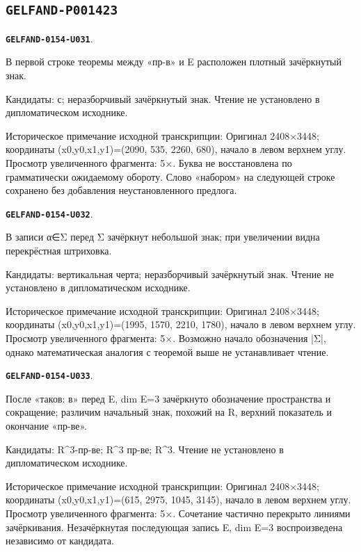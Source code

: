\documentclass[11pt]{article}
\theoremstyle{definition}
\theoremstyle{remark}
\begin{document}
\subsection*{\texttt{GELFAND-P001423}}
\par\noindent\leavevmode{}\label{GELFAND-0154-U031}\label{GELFAND-P001423:theorem-cancelled-sign:note}\textbf{\texttt{GELFAND-0154-U031}}.\nopagebreak[4]\par
В первой строке теоремы между «пр-в» и E расположен плотный зачёркнутый знак.\par
Кандидаты: с; неразборчивый зачёркнутый знак. Чтение не установлено в дипломатическом исходнике.\par
Историческое примечание исходной транскрипции: Оригинал 2408×3448; координаты (x0,y0,x1,y1)=(2090, 535, 2260, 680), начало в левом верхнем углу. Просмотр увеличенного фрагмента: 5×. Буква не восстановлена по грамматически ожидаемому обороту. Слово «набором» на следующей строке сохранено без добавления неустановленного предлога.\par\medskip
\par\noindent\leavevmode{}\label{GELFAND-0154-U032}\label{GELFAND-P001423:representation-cancelled-sign:note}\textbf{\texttt{GELFAND-0154-U032}}.\nopagebreak[4]\par
В записи α∈Σ перед Σ зачёркнут небольшой знак; при увеличении видна перекрёстная штриховка.\par
Кандидаты: вертикальная черта; неразборчивый зачёркнутый знак. Чтение не установлено в дипломатическом исходнике.\par
Историческое примечание исходной транскрипции: Оригинал 2408×3448; координаты (x0,y0,x1,y1)=(1995, 1570, 2210, 1780), начало в левом верхнем углу. Просмотр увеличенного фрагмента: 5×. Возможно начало обозначения |Σ|, однако математическая аналогия с теоремой выше не устанавливает чтение.\par\medskip
\par\noindent\leavevmode{}\label{GELFAND-0154-U033}\label{GELFAND-P001423:tetrahedron-cancelled-space:note}\textbf{\texttt{GELFAND-0154-U033}}.\nopagebreak[4]\par
После «таков: в» перед E, dim E=3 зачёркнуто обозначение пространства и сокращение; различим начальный знак, похожий на R, верхний показатель и окончание «пр-ве».\par
Кандидаты: R\textasciicircum{}3-пр-ве; R\textasciicircum{}3 пр-ве; R\textasciicircum{}3. Чтение не установлено в дипломатическом исходнике.\par
Историческое примечание исходной транскрипции: Оригинал 2408×3448; координаты (x0,y0,x1,y1)=(615, 2975, 1045, 3145), начало в левом верхнем углу. Просмотр увеличенного фрагмента: 5×. Сочетание частично перекрыто линиями зачёркивания. Незачёркнутая последующая запись E, dim E=3 воспроизведена независимо от кандидата.\par\medskip
\end{document}
